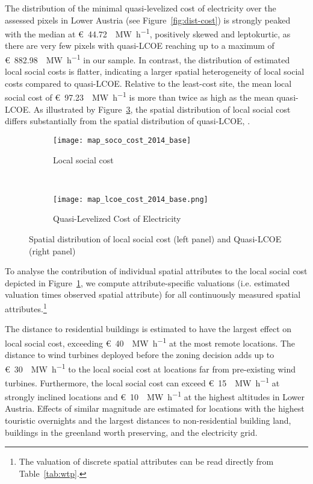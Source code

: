 \documentclass[review, a4paper, 12pt, authoryear, times]{elsarticle}
\begin{document}
The distribution of the minimal quasi-levelized cost of electricity over the assessed pixels in Lower Austria (see Figure~\ref{fig:dist-cost}) is strongly peaked with the median at \SI{44.72}[\euro]{\per\mega\watt\per\hour}, positively skewed and leptokurtic, as there are very few pixels with quasi-LCOE reaching up to a maximum of \SI{882.98}[\euro]{\per\mega\watt\per\hour} in our sample.
In contrast, the distribution of estimated local social costs is flatter, indicating a larger spatial heterogeneity of local social costs compared to quasi-LCOE.
Relative to the least-cost site, the mean local social cost of \SI{97.23}[\euro]{\per\mega\watt\per\hour} is more than twice as high as the mean quasi-LCOE. 
As illustrated by Figure~\ref{fig:loco-lcoe}, the spatial distribution of local social cost differs substantially from the spatial distribution of quasi-LCOE, .

\begin{figure}[t]
    \centering
    \begin{subfigure}[t]{0.5\textwidth}
        \centering
        \texttt{[image: map\_soco\_cost\_2014\_base]}
        \caption{Local social cost}
        \label{fig:map-social-cost}
    \end{subfigure}%
    ~ 
    \begin{subfigure}[t]{0.5\textwidth}
        \centering
        \texttt{[image: map\_lcoe\_cost\_2014\_base.png]}
        \caption{Quasi-Levelized Cost of Electricity}
        \label{fig:map-lcoe}
    \end{subfigure}
    \caption{Spatial distribution of local social cost (left panel) and Quasi-LCOE (right panel)}
    \label{fig:loco-lcoe}
\end{figure}

To analyse the contribution of individual spatial attributes to the local social cost depicted in Figure~\ref{fig:map-social-cost}, we compute attribute-specific valuations (i.e. estimated valuation times observed spatial attribute) for all continuously measured spatial attributes.\footnote{The valuation of discrete spatial attributes can be read directly from Table~\ref{tab:wtp}.}

The distance to residential buildings is estimated to have the largest effect on local social cost, exceeding \SI{40}[\euro]{\per\mega\watt\per\hour} at the most remote locations.
The distance to wind turbines deployed before the zoning decision adds up to \SI{30}[\euro]{\per\mega\watt\per\hour} to the local social cost at locations far from pre-existing wind turbines.
Furthermore, the local social cost can exceed \SI{15}[\euro]{\per\mega\watt\per\hour} at strongly inclined locations and \SI{10}[\euro]{\per\mega\watt\per\hour} at the highest altitudes in Lower Austria.
Effects of similar magnitude are estimated for locations with the highest touristic overnights and the largest distances to non-residential building land, buildings in the greenland worth preserving, and the electricity grid.
\end{document}
